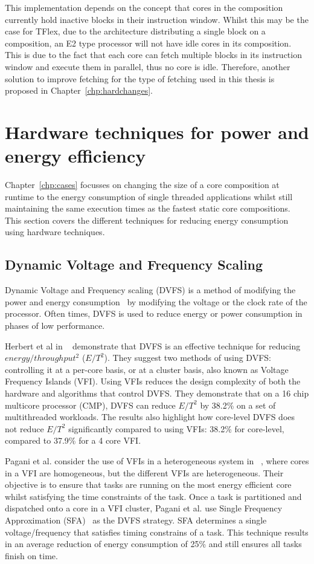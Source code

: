 This implementation depends on the concept that cores in the composition currently hold inactive blocks in their instruction window.
Whilst this may be the case for TFlex, due to the architecture distributing a single block on a composition, an E2 type processor will not have idle cores in its composition.
This is due to the fact that each core can fetch multiple blocks in its instruction window and execute them in parallel, thus no core is idle.
Therefore, another solution to improve fetching for the type of fetching used in this thesis is proposed in Chapter~\ref{chp:hardchanges}.
\vspace{-1em}
\section{Hardware techniques for power and energy efficiency}

Chapter~\ref{chp:cases} focusses on changing the size of a core composition at runtime to the energy consumption of single threaded applications whilst still maintaining the same execution times as the fastest static core compositions.
This section covers the different techniques for reducing energy consumption using hardware techniques.

\subsection{Dynamic Voltage and Frequency Scaling}
Dynamic Voltage and Frequency scaling (DVFS) is a method of modifying the power and energy consumption~\cite{paganiEECHM2017} by modifying the voltage or the clock rate of the processor.
Often times, DVFS is used to reduce energy or power consumption in phases of low performance.

Herbert et al in ~\cite{herbertDVFS07} demonstrate that DVFS is an effective technique for reducing $energy/throughput^2$ ($E/T^2$).
They suggest two methods of using DVFS: controlling it at a per-core basis, or at a cluster basis, also known as Voltage Frequency Islands (VFI).
Using VFIs reduces the design complexity of both the hardware and algorithms that control DVFS.
They demonstrate that on a 16 chip multicore processor (CMP), DVFS can reduce $E/T^2$ by 38.2\% on a set of multithreaded workloads.
The results also highlight how core-level DVFS does not reduce $E/T^2$ significantly compared to using VFIs: 38.2\% for core-level, compared to 37.9\% for a 4 core VFI.

Pagani et al. consider the use of VFIs in a heterogeneous system in ~\cite{paganiEECHM2017}, where cores in a VFI are homogeneous, but the different VFIs are heterogeneous.
Their objective is to ensure that tasks are running on the most energy efficient core whilst satisfying the time constraints of the task.
Once a task is partitioned and dispatched onto a core in a VFI cluster, Pagani et al. use Single Frequency Approximation (SFA)~\cite{sfaScheme} as the DVFS strategy.
SFA determines a single voltage/frequency that satisfies timing constrains of a task.
This technique results in an average reduction of energy consumption of 25\% and still ensures all tasks finish on time.


